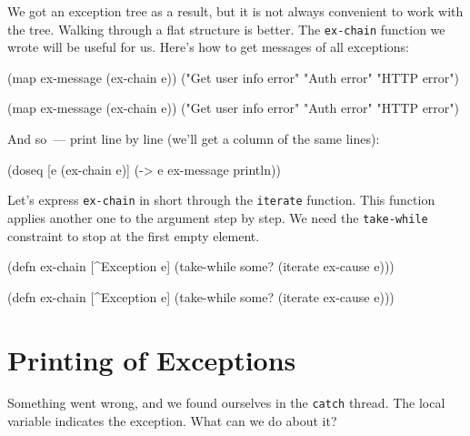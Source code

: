 \fi


We got an exception tree as a result, but it is not always convenient to work with the tree. Walking through a flat structure is better. The \verb|ex-chain| function we wrote will be useful for us. Here's how to get messages of all exceptions:

\ifx\DEVICETYPE\MOBILE

\begin{clojure}
(map ex-message (ex-chain e))
("Get user info error"
 "Auth error" "HTTP error")
\end{clojure}

\else

\begin{clojure}
(map ex-message (ex-chain e))
("Get user info error" "Auth error" "HTTP error")
\end{clojure}

\fi

\noindent
And so~--- print line by line (we'll get a column of the same lines):


\begin{clojure}
(doseq [e (ex-chain e)]
  (-> e ex-message println))
\end{clojure}

Let's express \verb|ex-chain| in short through the \verb|iterate| function. This function applies another one to the argument step by step. We need the \verb|take-while| constraint to stop at the first empty element.

\ifx\DEVICETYPE\MOBILE

\begin{clojure}
(defn ex-chain [^Exception e]
  (take-while some?
    (iterate ex-cause e)))
\end{clojure}

\else

\begin{clojure}
(defn ex-chain [^Exception e]
  (take-while some? (iterate ex-cause e)))
\end{clojure}

\fi

\section{Printing of Exceptions}

Something went wrong, and we found ourselves in the \verb|catch| thread. The local variable indicates the exception. What can we do about it?

